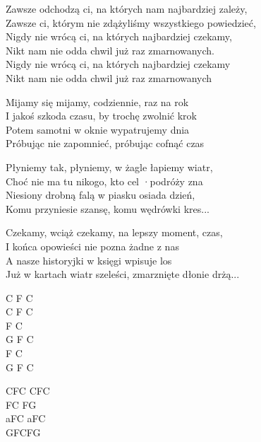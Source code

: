 \begin{text}

    Zawsze odchodzą ci, na których nam najbardziej zależy,\\
    Zawsze ci, którym nie zdążyliśmy wszystkiego powiedzieć,\\
    Nigdy nie wrócą ci, na których najbardziej czekamy,\\
    Nikt nam nie odda chwil już raz zmarnowanych.\\
    Nigdy nie wrócą ci, na których najbardziej czekamy\\
    Nikt nam nie odda chwil już raz zmarnowanych

    Mijamy się mijamy, codziennie, raz na rok\\
    I jakoś szkoda czasu, by trochę zwolnić krok\\
    Potem samotni w oknie wypatrujemy dnia\\
    Próbując nie zapomnieć, próbując cofnąć czas

    Płyniemy tak, płyniemy, w żagle łapiemy wiatr,\\
    Choć nie ma tu nikogo, kto cel ·podróży zna\\
    Niesiony drobną falą w piasku osiada dzień,\\
    Komu przyniesie szansę, komu wędrówki kres...

    Czekamy, wciąż czekamy, na lepszy moment, czas,\\
    I końca opowieści nie pozna żadne z nas\\
    A nasze historyjki w księgi wpisuje los\\
    Już w kartach wiatr szeleści, zmarznięte dłonie drżą...
    
\end{text}
\begin{chord}
    \small{
    C F C\\
    C F C\\
    F C\\
    G F C\\
    F C\\
    G F C

    CFC CFC\\
    FC FG\\
    aFC aFC\\
    GFCFG
    }
\end{chord}